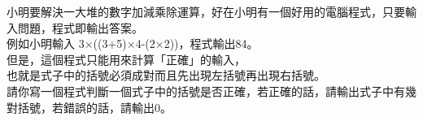 小明要解決一大堆的數字加減乘除運算，好在小明有一個好用的電腦程式，只要輸入問題，程式即輸出答案。\\
例如小明輸入 3×((3+5)×4-(2×2))，程式輸出84。\\
但是，這個程式只能用來計算「正確」的輸入，\\
也就是式子中的括號必須成對而且先出現左括號再出現右括號。\\
請你寫一個程式判斷一個式子中的括號是否正確，若正確的話，請輸出式子中有幾對括號，若錯誤的話，請輸出0。\\
